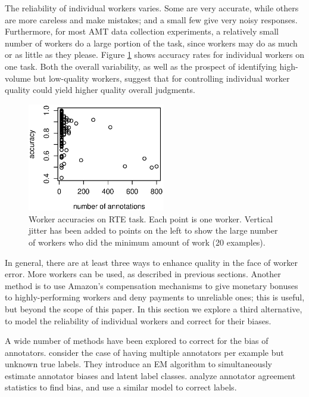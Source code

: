 \documentclass[11pt]{article}
\begin{document}
The reliability of individual workers varies.  Some are very accurate, while others are more careless and make mistakes; and a small few give very noisy responses.  Furthermore, for most AMT data collection experiments, a relatively small number of workers do a large portion of the task, since workers may do as much or as little as they please.  Figure \ref{Workers} shows accuracy rates for individual workers on one task.  Both the overall variability, as well as the prospect of identifying high-volume but low-quality workers, suggest that for controlling individual worker quality could yield higher quality overall judgments.

\begin{figure}[t]
\centering
\includegraphics[width=6cm]{figures/workers.eps}
\caption{Worker accuracies on RTE task.  Each point is one worker.  Vertical jitter has been added to points on the left to show the large number of workers who did the minimum amount of work (20 examples).} \label{Workers}
\end{figure}
In general, there are at least three ways to enhance quality in the face of worker error.  More workers can be used, as described in previous sections.  
Another method is to use Amazon's compensation mechanisms to give monetary bonuses to highly-performing workers and deny payments to unreliable ones; this is useful, but beyond the scope of this paper.  In this section we explore a third alternative, to model the reliability of individual workers and correct for their biases.

A wide number of methods have been explored to correct for the bias of annotators.   consider the case of having multiple annotators per example but unknown true labels.  They introduce an EM algorithm to simultaneously estimate annotator biases and latent label classes.   analyze annotator agreement statistics to find bias, and use a similar model to correct labels.
\end{document}
